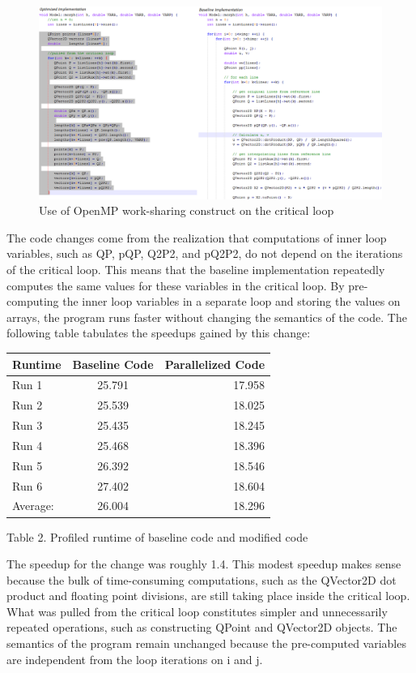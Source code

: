 \documentclass[12pt]{article}
\begin{document}
\begin{figure}[H]%
\centering%
\includegraphics[scale=0.6]{codechange2.png}%
\caption{Use of OpenMP work-sharing construct on the critical loop}%
\label{fig:codechange2}%
\end{figure}


The code changes come from the realization that computations of inner loop variables, such as QP,
pQP, Q2P2, and pQ2P2, do not depend on the iterations of the critical loop. This means that the
baseline implementation repeatedly computes the same values for these variables in the critical loop.
By pre-computing the inner loop variables in a separate loop and storing the values on arrays, the
program runs faster without changing the semantics of the code. The following table tabulates the 
speedups gained by this change:
\\
\begin{center}
\begin{tabular}{l c r}
    Runtime & Baseline Code & Parallelized Code \\
    \hline
    Run 1 & 25.791 & 17.958\\
    Run 2 & 25.539 & 18.025\\
    Run 3 & 25.435 & 18.245\\
    Run 4 & 25.468 & 18.396\\
    Run 5 & 26.392 & 18.546\\
    Run 6 & 27.402 & 18.604\\
    \hline
    Average: & 26.004 & 18.296\\
\end{tabular}
\end{center}
\begin{center}Table 2. Profiled runtime of baseline code and modified code\end{center}
The speedup for the change was roughly 1.4. This modest speedup makes sense because the bulk of
time-consuming computations, such as the QVector2D dot product and floating point divisions, are
still taking place inside the critical loop. What was pulled from the critical loop constitutes
simpler and unnecessarily repeated operations, such as constructing QPoint and QVector2D objects. 
The semantics of the program remain unchanged because the pre-computed variables are independent 
from the loop iterations on i and j.
\end{document}
